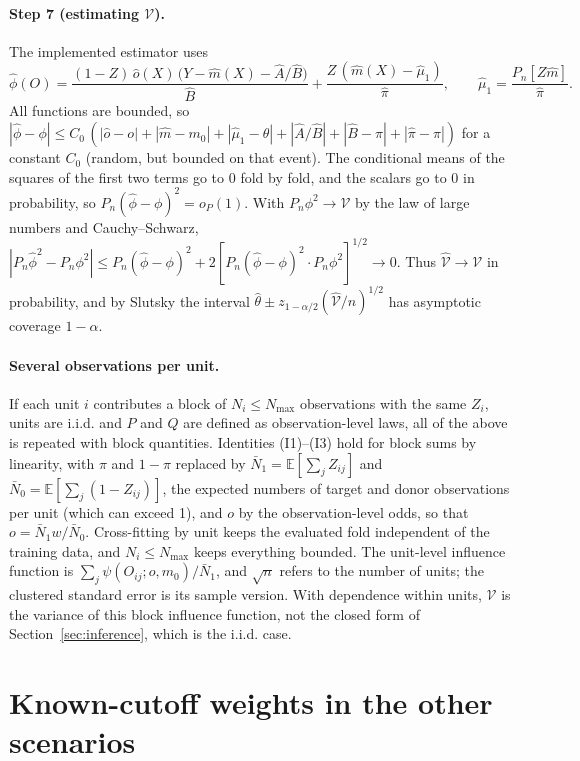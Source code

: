 \documentclass[twoside,11pt]{article}
\newcommand{\E}{\mathbb{E}}
\theoremstyle{plain}
\theoremstyle{definition}
\begin{document}
\paragraph{Step 7 (estimating $\mathcal V$).} The implemented estimator uses
\[
\hat\phi(O)=\frac{(1-Z)\,\hat o(X)\,\bigl(Y-\hat m(X)-\hat A/\hat B\bigr)}{\hat B}+\frac{Z\,(\hat m(X)-\hat\mu_1)}{\hat\pi},\qquad\hat\mu_1=\frac{P_n[Z\hat m]}{\hat\pi}.
\]
All functions are bounded, so $|\hat\phi-\phi|\le C_0\,(|\hat o-o|+|\hat m-m_0|+|\hat\mu_1-\theta|+|\hat A/\hat B|+|\hat B-\pi|+|\hat\pi-\pi|)$ for a constant $C_0$ (random, but bounded on that event). The conditional means of the squares of the first two terms go to 0 fold by fold, and the scalars go to 0 in probability, so $P_n(\hat\phi-\phi)^2=o_P(1)$. With $P_n\phi^2\to \mathcal V$ by the law of large numbers and Cauchy--Schwarz, $|P_n\hat\phi^2-P_n\phi^2|\le P_n(\hat\phi-\phi)^2+2[P_n(\hat\phi-\phi)^2\cdot P_n\phi^2]^{1/2}\to0$. Thus $\hat{\mathcal V}\to \mathcal V$ in probability, and by Slutsky the interval $\hat\theta\pm z_{1-\alpha/2}(\hat{\mathcal V}/n)^{1/2}$ has asymptotic coverage $1-\alpha$.

\paragraph{Several observations per unit.} If each unit $i$ contributes a block of $N_i\le N_{\max}$ observations with the same $Z_i$, units are i.i.d. and $P$ and $Q$ are defined as observation-level laws, all of the above is repeated with block quantities. Identities (I1)--(I3) hold for block sums by linearity, with $\pi$ and $1-\pi$ replaced by $\bar N_1=\E[\sum_jZ_{ij}]$ and $\bar N_0=\E[\sum_j(1-Z_{ij})]$, the expected numbers of target and donor observations per unit (which can exceed 1), and $o$ by the observation-level odds, so that $o=\bar N_1w/\bar N_0$. Cross-fitting by unit keeps the evaluated fold independent of the training data, and $N_i\le N_{\max}$ keeps everything bounded. The unit-level influence function is $\sum_j\psi(O_{ij};o,m_0)/\bar N_1$, and $\sqrt n$ refers to the number of units; the clustered standard error is its sample version. With dependence within units, $\mathcal V$ is the variance of this block influence function, not the closed form of Section~\ref{sec:inference}, which is the i.i.d. case.
\section{Known-cutoff weights in the other scenarios}\label{app:extra}
\end{document}
